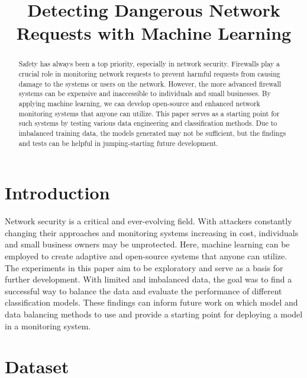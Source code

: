\documentclass[conference]{IEEEtran}
\begin{document}
\title{Detecting Dangerous Network Requests with Machine Learning}

\author{
}

\maketitle

\begin{abstract}
Safety has always been a top priority, especially in network security. Firewalls play a crucial role in monitoring network requests to prevent harmful requests from causing damage to the systems or users on the network. However, the more advanced firewall systems can be expensive and inaccessible to individuals and small businesses. By applying machine learning, we can develop open-source and enhanced network monitoring systems that anyone can utilize. This paper serves as a starting point for such systems by testing various data engineering and classification methods. Due to imbalanced training data, the models generated may not be sufficient, but the findings and tests can be helpful in jumping-starting future development.
\end{abstract}

\section{Introduction}
Network security is a critical and ever-evolving field. With attackers constantly changing their approaches and monitoring systems increasing in cost, individuals and small business owners may be unprotected. Here, machine learning can be employed to create adaptive and open-source systems that anyone can utilize. The experiments in this paper aim to be exploratory and serve as a basis for further development. With limited and imbalanced data, the goal was to find a successful way to balance the data and evaluate the performance of different classification models. These findings can inform future work on which model and data balancing methods to use and provide a starting point for deploying a model in a monitoring system.

\section{Dataset}
\end{document}
